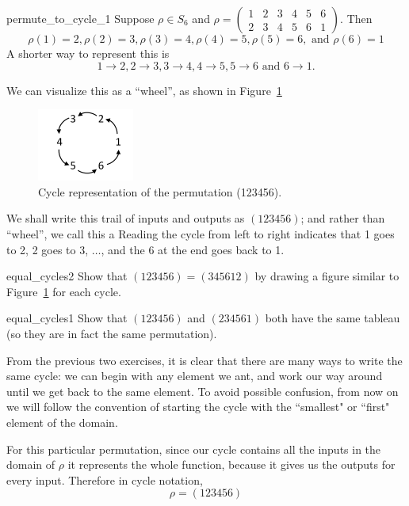 \begin{example}{permute_to_cycle_1}
Suppose $\rho \in S_6$ and $\rho = \begin{pmatrix} 1 & 2 & 3 & 4 & 5 & 6 \\ 2 & 3 & 4 & 5 & 6 & 1 \end{pmatrix}$.  Then
\[
\rho(1) = 2, \rho(2) = 3, \rho(3) = 4, \rho(4) = 5, \rho(5) = 6, \mbox{ and } \rho(6) = 1
\]
A shorter way to represent this is
\[
1 \to 2, 2 \to 3, 3 \to 4, 4 \to 5, 5 \to 6 \mbox { and } 6 \to 1.
\]

\noindent
We can visualize this as a ``wheel'', as shown in Figure~\ref{fig:cycle}

\begin{figure}[ht]
\begin{center}
\includegraphics[width=1.25in]{images/perm_cycle.png}
\caption{Cycle representation of the  permutation (123456).}\label{fig:cycle}
\end{center}
\end{figure}

We shall write this trail of inputs and outputs as $(123456)$; and rather than ``wheel'', we call this a   Reading the cycle from left to right indicates that 1 goes to 2, 2 goes to 3, $\ldots$, and the 6 at the end goes back to 1.  %

\begin{exercise}{equal_cycles2}
Show that $(123456) = (345612)$ by drawing a figure similar to Figure~\ref{fig:cycle}  for each cycle.
\end{exercise}

\begin{exercise}{equal_cycles1}
Show that $(123456)$  and $(234561)$ both have the same tableau (so they are in fact the same permutation).
\end{exercise}

From the previous two exercises, it is clear that there are many ways to write the same cycle: we can begin with any element we ant, and work our way around until we get back to the same element. To avoid possible confusion, from now on we will follow the convention of starting the cycle with the ``smallest"  or ``first" element of the domain.

For this particular permutation, since our cycle contains all the inputs in the domain of $\rho$ it represents the whole function, because it gives us the outputs for every input.  Therefore in cycle notation, 
\[
\rho = (123456) \]
\end{example}

